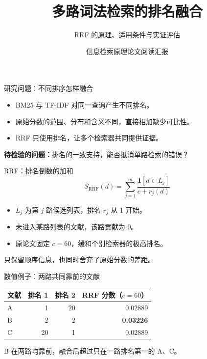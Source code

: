 \documentclass[aspectratio=169,11pt]{beamer}
\title{多路词法检索的排名融合}
\subtitle{RRF 的原理、适用条件与实证评估}
\author{信息检索原理\quad 论文阅读汇报}
\date{}
\begin{document}
\begin{frame}\titlepage
{}
\end{frame}

\begin{frame}{研究问题：不同排序怎样融合}
\begin{itemize}\setlength\itemsep{1em}
\item BM25 与 TF-IDF 对同一查询产生不同排名。
\item 原始分数的范围、分布和含义不同，直接相加缺少可比性。
\item RRF 只使用排名，让多个检索器共同提供证据。
\end{itemize}
\vfill
\textbf{待检验的问题：}排名的一致支持，能否抵消单路检索的错误？
\end{frame}

\begin{frame}{RRF：排名倒数的加和}
\[
 S_{\mathrm{RRF}}(d)=\sum_{j=1}^{m}\frac{\mathbf{1}[d\in L_j]}{c+r_j(d)}
\]
\begin{itemize}\setlength\itemsep{0.65em}
\item $L_j$ 为第 $j$ 路候选列表，排名 $r_j$ 从 1 开始。
\item 未进入某路列表的文献，该路贡献为 0。
\item 原论文固定 $c=60$，缓和个别检索器的极高排名。
\end{itemize}
\vfill
只保留顺序信息，也同时舍弃了原始分数的差距。
\end{frame}

\begin{frame}{数值例子：两路共同靠前的文献}
\centering
\renewcommand\arraystretch{1.6}
\begin{tabular}{lrrr}\toprule
文献 & 排名 1 & 排名 2 & RRF 分数（$c=60$）\\\midrule
A & 1 & 20 & 0.02889\\
B & 2 & 2 & \textbf{0.03226}\\
C & 20 & 1 & 0.02889\\\bottomrule
\end{tabular}
\vfill
\raggedright
B 在两路均靠前，融合后超过只在一路排名第一的 A、C。
\end{frame}
\end{document}
